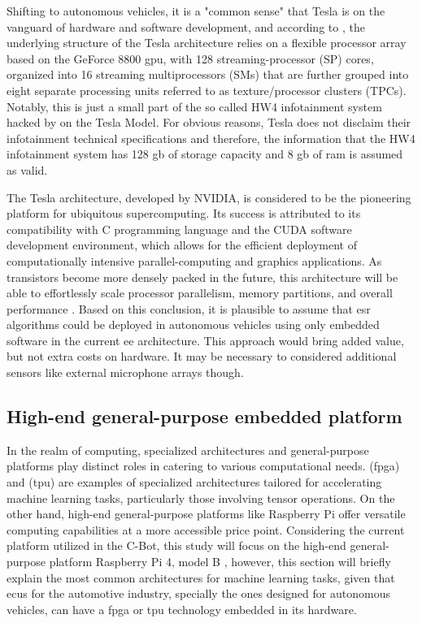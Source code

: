 Shifting to autonomous vehicles, it is a "common sense" that Tesla is on the vanguard of hardware and software development, and according to \textcite{Lindholm2008}, the underlying structure of the Tesla architecture relies on a flexible processor array based on the GeForce 8800 \gls{gpu}, with 128 streaming-processor (SP) cores, organized into 16 streaming multiprocessors (SMs) that are further grouped into eight separate processing units referred to as texture/processor clusters (TPCs). Notably, this is just a small part of the so called HW4 infotainment system hacked by \textcite{Teslanorth2023} on the Tesla Model. For obvious reasons, Tesla does not disclaim their infotainment technical specifications and therefore, the information that the HW4 infotainment system has 128 \gls{g}\gls{b} of storage capacity and 8 \gls{g}\gls{b} of \gls{ram} is assumed as valid.

The Tesla architecture, developed by NVIDIA, is considered to be the pioneering platform for ubiquitous supercomputing. Its success is attributed to its compatibility with C programming language and the CUDA software development environment, which allows for the efficient deployment of computationally intensive parallel-computing and graphics applications. As transistors become more densely packed in the future, this architecture will be able to effortlessly scale processor parallelism, memory partitions, and overall performance \cite{Lindholm2008}. Based on this conclusion, it is plausible to assume that \gls{esr} algorithms could be deployed in autonomous vehicles using only embedded software in the current \gls{ee} architecture. This approach would bring added value, but not extra costs on hardware. It may be necessary to considered additional sensors like external microphone arrays though.


\subsection{High-end general-purpose embedded platform}
\label{subsec:ECU_high-end-platform}

In the realm of computing, specialized architectures and general-purpose platforms play distinct roles in catering to various computational needs.  (\gls{fpga}) and  (\gls{tpu}) are examples of specialized architectures tailored for accelerating machine learning tasks, particularly those involving tensor operations. On the other hand, high-end general-purpose platforms like Raspberry Pi offer versatile computing capabilities at a more accessible price point. Considering the current platform utilized in the C-Bot, this study will focus on the high-end general-purpose platform Raspberry Pi 4, model B \cite{Raspberry2023}, however, this section will briefly explain the most common architectures for machine learning tasks, given that \gls{ecu}s for the automotive industry, specially the ones designed for autonomous vehicles, can have a \gls{fpga} or \gls{tpu} technology embedded in its hardware.

